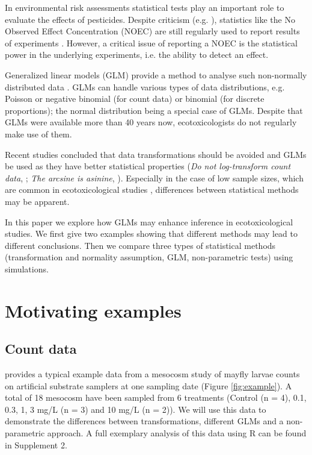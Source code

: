 \documentclass{scrartcl}
\begin{document}
In environmental risk assessments statistical tests play an important role to evaluate the effects of pesticides. 
Despite criticism (e.g. \citealp{landis_well_2011}), statistics like the No Observed Effect Concentration (NOEC) are still regularly used to report results of experiments \citep{jager_bad_2012}.
However, a critical issue of reporting a NOEC is the statistical power in the underlying experiments, i.e. the ability to detect an effect.

Generalized linear models (GLM) provide a method to analyse such non-normally distributed data \citep{nelder_generalized_1972}.
GLMs can handle various types of data distributions, e.g. Poisson or negative binomial (for count data) or binomial (for discrete proportions); the normal distribution being a special case of GLMs.
Despite that GLMs were available more than 40 years now, ecotoxicologists do not regularly make use of them.

Recent studies concluded that data transformations should be avoided and GLMs be used as they have better statistical properties (\emph{Do not log-transform count data}, \citep{ohara_not_2010}; \emph{The arcsine is asinine}, \citep{warton_arcsine_2011}).
Especially in the case of low sample sizes, which are common in ecotoxicological studies \citep{sanderson_pesticide_2002,szocs_analysing_2015}, differences between statistical methods may be apparent. 


In this paper we explore how GLMs may enhance inference in ecotoxicological studies.
We first give two examples showing that different methods may lead to different conclusions. 
Then we compare three types of statistical methods (transformation and normality assumption, GLM, non-parametric tests) using simulations.


\section{Motivating examples}
\label{sec:motiv}
\subsection{Count data}
\citet{brock_minimum_2015} provides a typical example data from a mesocosm study of mayfly larvae counts on artificial substrate samplers at one sampling date (Figure \ref{fig:example}). 
A total of 18 mesocosm have been sampled from 6 treatments (Control (n = 4), 0.1, 0.3, 1, 3 mg/L (n = 3) and 10 mg/L (n = 2)).
We will use this data to demonstrate the differences between transformations, different GLMs and a non-parametric approach.
A full exemplary analysis of this data using R \citep{r_core_team_r:_2014} can be found in Supplement 2.
\end{document}
